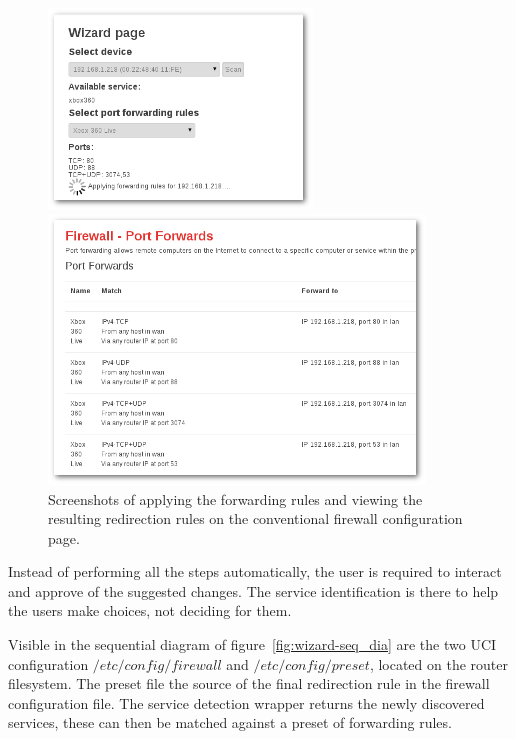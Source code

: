\documentclass[a4paper,11pt,makeidx]{kth-bcs}
\begin{document}
\begin{figure}[h]
   \begin{minipage}[b]{0.40\linewidth}
      \centering
      \includegraphics[width=7cm]{ss-applying-shadow}
   \end{minipage}
   \begin{minipage}[b]{0.50\linewidth}
      \includegraphics[width=10cm]{ss-results-shadow.png}
   \end{minipage}
   \caption{Screenshots of applying the forwarding rules and viewing the resulting redirection rules on the conventional firewall configuration page.}
   \label{fig:results}
\end{figure}

Instead of performing all the steps automatically, the user is required to interact and approve of the suggested changes.
The service identification is there to help the users make choices, not deciding for them.

Visible in the sequential diagram of figure~\ref{fig:wizard-seq_dia} are the two UCI configuration $/etc/config/firewall$ and $/etc/config/preset$, located on the router filesystem.
The preset file the source of the final redirection rule in the firewall configuration file.
The service detection wrapper returns the newly discovered services, these can then be matched against a preset of forwarding rules.
\end{document}
